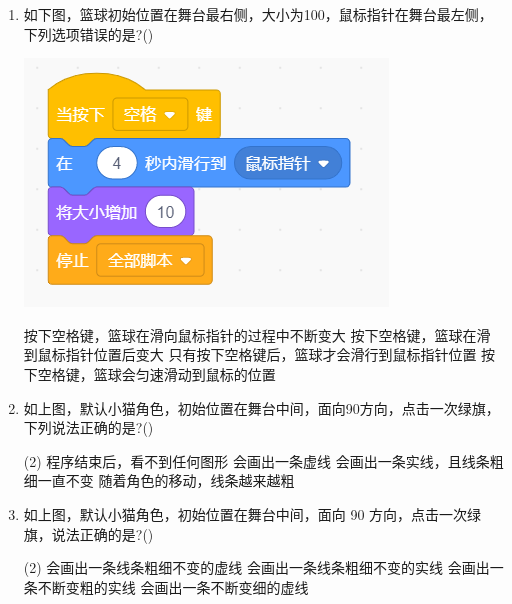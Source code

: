 \documentclass[10pt, a4paper]{article}
\begin{document}
\begin{enumerate}
        \item 如下图，篮球初始位置在舞台最右侧，大小为100，鼠标指针在舞台最左侧，下列选项错误的是?(\qquad)
        
        \begin{minipage}{.25\textwidth}
            \centering
            \includegraphics[width=\textwidth]{3.png}
        \end{minipage}
        \begin{minipage}{.64\textwidth}
            \begin{tasks}
                \task 按下空格键，篮球在滑向鼠标指针的过程中不断变大
                \task 按下空格键，篮球在滑到鼠标指针位置后变大
                \task 只有按下空格键后，篮球才会滑行到鼠标指针位置
                \task 按下空格键，篮球会匀速滑动到鼠标的位置
            \end{tasks}
        \end{minipage}

        \item 如上图，默认小猫角色，初始位置在舞台中间，面向90方向，点击一次绿旗，下列说法正确的是?(\qquad)
        \begin{tasks}(2)
            \task 程序结束后，看不到任何图形
            \task 会画出一条虚线
            \task 会画出一条实线，且线条粗细一直不变
            \task 随着角色的移动，线条越来越粗
        \end{tasks}

        \item 如上图，默认小猫角色，初始位置在舞台中间，面向 90 方向，点击一次绿旗，说法正确的是?(\qquad)
        \begin{tasks}(2)
            \task 会画出一条线条粗细不变的虚线
            \task 会画出一条线条粗细不变的实线
            \task 会画出一条不断变粗的实线
            \task 会画出一条不断变细的虚线
        \end{tasks}


\end{enumerate}
\end{document}

